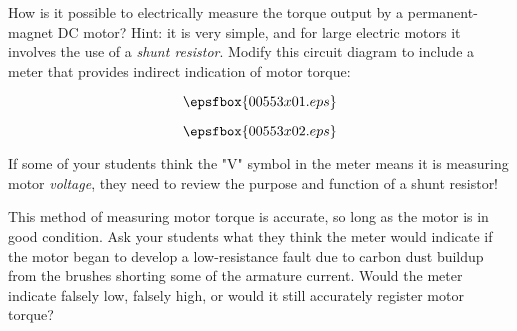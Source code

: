 

How is it possible to electrically measure the torque output by a permanent-magnet DC motor?  Hint: it is very simple, and for large electric motors it involves the use of a {\it shunt resistor}.  Modify this circuit diagram to include a meter that provides indirect indication of motor torque:

$$\epsfbox{00553x01.eps}$$







$$\epsfbox{00553x02.eps}$$







If some of your students think the "V" symbol in the meter means it is measuring motor {\it voltage}, they need to review the purpose and function of a shunt resistor!

This method of measuring motor torque is accurate, so long as the motor is in good condition.  Ask your students what they think the meter would indicate if the motor began to develop a low-resistance fault due to carbon dust buildup from the brushes shorting some of the armature current.  Would the meter indicate falsely low, falsely high, or would it still accurately register motor torque?




